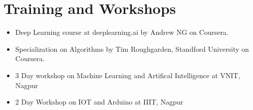 \documentclass[a4paper,10pt]{extarticle} %
\begin{document}
\vspace{-0.2cm}
\section{\textcolor{primary}{Training and Workshops}}
\vspace{0.2cm}
\begin{itemize}[leftmargin=0.55cm, rightmargin=0.2cm, label={\Large\textbullet}]
\item Deep Learning course at deeplearning.ai by Andrew NG on Coursera.
\vspace{-0.15cm}
\item Specialization on Algorithms by Tim Roughgarden, Standford University on Coursera.
\vspace{-0.15cm}
\item 3 Day workshop on Machine Learning and Artifical Intelligence at VNIT, Nagpur
\vspace{-0.15cm}
\item 2 Day Workshop on IOT and Arduino at IIIT, Nagpur
\end{itemize}



\vspace{0.3cm}
\end{document}
